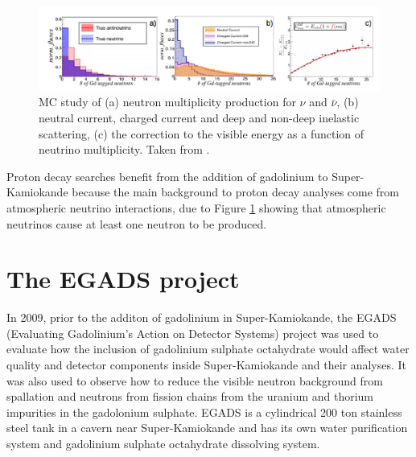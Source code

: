 \begin{figure}[H]
    \includegraphics[width=\textwidth]{Figures/atm_recon_energy.png}
\caption{MC study of (a) neutron multiplicity production for $\nu$ and ${\bar{\nu}}$, (b) neutral current, charged current and deep and non-deep inelastic scattering, (c) the correction to the visible energy as a function of neutrino multiplicity. Taken from \cite{martiEvaluationGadoliniumAction2020}.}
\label{fig:atm_nu_energy}
\end{figure}


Proton decay searches benefit from the addition of gadolinium to Super-Kamiokande because the main background to proton decay analyses come from atmospheric neutrino interactions, due to Figure \ref{fig:atm_nu_energy} showing that atmospheric neutrinos cause at least one neutron to be produced. 

\section{The EGADS project}

In 2009, prior to the additon of gadolinium in Super-Kamiokande, the EGADS (Evaluating Gadolinium's Action on Detector Systems) project was used to evaluate how the inclusion of gadolinium sulphate octahydrate would affect water quality and detector components inside Super-Kamiokande and their analyses. It was also used to observe how to reduce the visible neutron background from spallation and neutrons from fission chains from the uranium and thorium impurities in the gadolonium sulphate. EGADS is a cylindrical 200 ton stainless steel tank in a cavern near Super-Kamiokande and has its own water purification system and gadolinium sulphate octahydrate dissolving system. 




